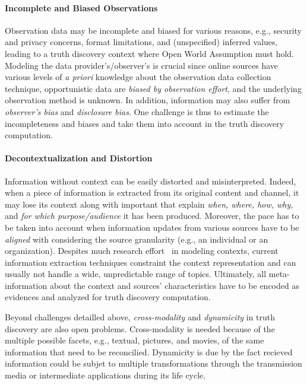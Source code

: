 \documentclass[prodmode,acmtecs]{acmsmall} %
\begin{document}
\paragraph*{Incomplete and Biased Observations}  
Observation data may be incomplete and biased for various 
reasons, e.g., security and privacy concerns, format limitations, and 
(unspecified) inferred values, leading to a truth discovery context where Open World
Assumption must hold. Modeling the data provider's/observer's is crucial since online 
sources have  various levels of {\it a priori} knowledge about the observation data 
collection technique, opportunistic data are {\it biased by  observation effort}, and the underlying
observation method is unknown. In addition, information may also suffer from \emph{observer's bias} and
\emph{disclosure bias}. One challenge is thus to estimate the incompleteness and biases and take them into
account in the truth discovery computation.

\paragraph*{Decontextualization and Distortion}  
Information without context can be easily distorted and misinterpreted.
Indeed, when a piece of information is extracted from its original 
content and channel, it may lose its context along with important 
 that explain \emph{when, where, how, why,} and
\emph{for which purpose/audience} it has been produced.
Moreover, the pace has to be taken into account when information updates from 
various sources have to be \emph{aligned} with considering the source granularity 
(e.g., an individual or an organization). 
Despites much research effort~\cite{eps270829} in modeling contexts, current information
extraction techniques constraint the 
context representation and can usually not handle a wide, unpredictable range of topics. Ultimately,
all meta-information about the context and sources' 
characteristics have to be encoded as evidences and analyzed for truth discovery computation.

Beyond challenges detailled above, \emph{cross-modality} and \emph{dynamicity} in truth discovery
are also open problems. Cross-modality is needed because of the multiple possible facets,
e.g., textual, pictures, and movies, of the same information that need to be reconcilied.
Dynamicity is due by the fact recieved information could be subjet to multiple transformations
through the transmission media or intermediate applications during its life cycle.  
 







\medskip
\end{document}
